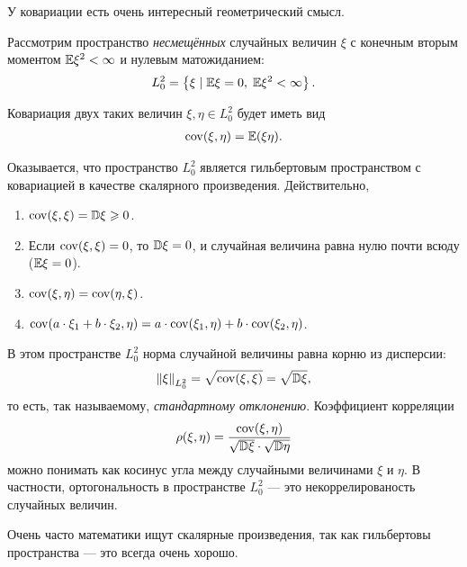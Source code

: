 \documentclass[../main.tex]{subfiles}
\begin{document}
\begin{remrk}
 \label{remark:cov_geometric_intuition}
 У ковариации есть очень интересный геометрический смысл. 

 Рассмотрим пространство \textit{несмещённых} случайных величин $ \xi $ с конечным вторым моментом $ \mathbb E\xi^{2} < \infty $ и нулевым матожиданием:
 \begin{align*}
  L^{2}_0 = \left\{ \xi \mid \mathbb E\xi = 0,\; \mathbb E\xi^{2} < \infty \right\}.
 \end{align*}

 Ковариация двух таких величин $ \xi,\eta\in L^{2}_0 $ будет иметь вид
 \begin{align*}
  \mathrm{cov}(\xi,\eta) = \mathbb E(\xi\eta).
 \end{align*}

 Оказывается, что пространство $ L^{2}_0 $ является гильбертовым пространством с ковариацией в качестве скалярного произведения. Действительно,
 \begin{enumerate}
  \item $ \mathrm{cov}(\xi,\xi) = \mathbb D\xi \geqslant 0 $.
  \item Если $ \mathrm{cov}(\xi, \xi) = 0 $, то $ \mathbb D\xi = 0 $, и случайная величина равна нулю почти всюду ($ \mathbb E\xi = 0$).
  \item $ \mathrm{cov}(\xi,\eta) = \mathrm{cov}(\eta,\xi) $.
  \item $ \mathrm{cov}(a \cdot \xi_1 + b \cdot \xi_2, \eta) = a \cdot \mathrm{cov}(\xi_1, \eta) + b \cdot \mathrm{cov}(\xi_2,\eta) $.
 \end{enumerate}

 В этом пространстве  $ L^{2}_0 $  норма случайной величины равна корню из дисперсии:
 \begin{align*}
  \left\| \xi \right\|_{L^{2}_0} = \sqrt{\mathrm{cov}(\xi,\xi)} = \sqrt{\mathbb D\xi},
 \end{align*} то есть, так называемому, \textit{стандартному отклонению}. Коэффициент корреляции
 \begin{align*}
  \rho(\xi,\eta) = \frac{\mathrm{cov}(\xi,\eta)}{\sqrt{\mathbb D\xi} \cdot \sqrt{\mathbb D\eta}}
 \end{align*} можно понимать как косинус угла между случайными величинами $ \xi $ и $ \eta $. В частности, ортогональность в пространстве $ L^{2}_0 $ --- это некоррелированость случайных величин.

 Очень часто математики ищут скалярные произведения, так как гильбертовы пространства --- это всегда очень хорошо.

\end{remrk}
\end{document}
